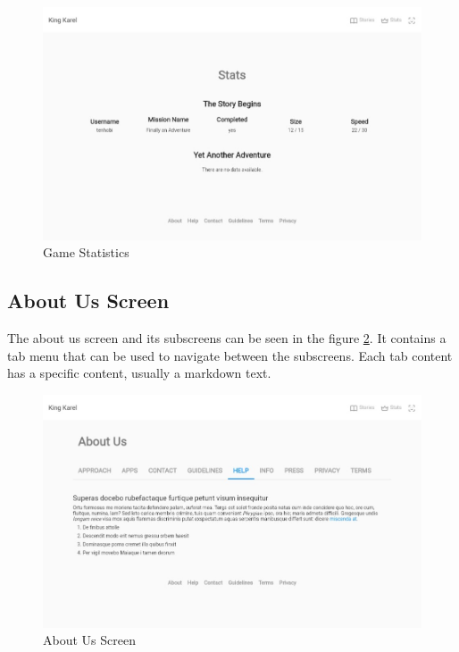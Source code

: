 \begin{figure}
    \centering
    \includegraphics[width=1\linewidth]{assets/implementation/ui/kingkarel_stats.jpeg}
    \caption{Game Statistics}
    \label{fig:implementation:ui:stats}
\end{figure}

\subsection{About Us Screen}

The about us screen and its subscreens can be seen in the figure \ref{fig:implementation:ui:aboutus}.
It contains a tab menu that can be used to navigate between the subscreens.
Each tab content has a specific content, usually a markdown text.

\begin{figure}
    \centering
    \includegraphics[width=1\linewidth]{assets/implementation/ui/kingkarel_aboutus.jpeg}
    \caption{About Us Screen}
    \label{fig:implementation:ui:aboutus}
\end{figure}
